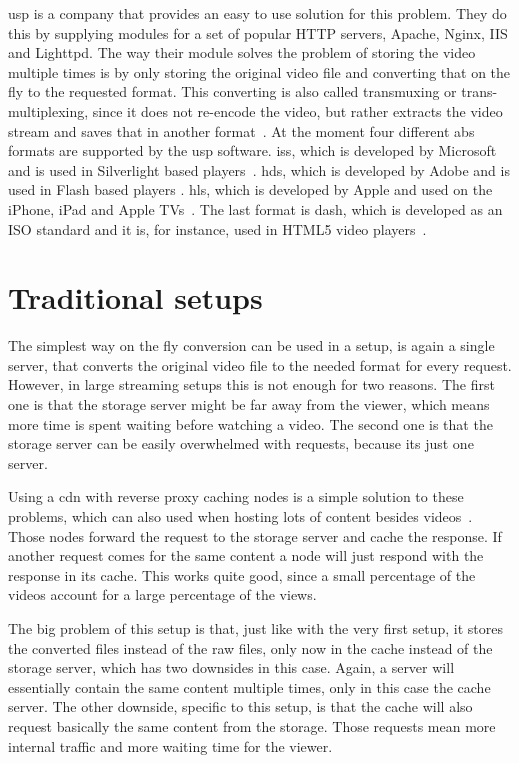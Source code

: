 \documentclass[twoside,openright]{uva-bachelor-thesis}
\begin{document}
\Gls{usp} is a company that provides an easy to use solution for this problem.
They do this by supplying modules for a set of popular HTTP servers, Apache,
Nginx, IIS and Lighttpd. The way their module solves the problem of storing the
video multiple times is by only storing the original video file and converting
that on the fly to the requested format. This converting is also called
transmuxing or trans-multiplexing, since it does not re-encode the video, but
rather extracts the video stream and saves that in another
format~\autocite{transmux}.  At the
moment four different \gls{abs} formats are supported by the \gls{usp} software.
\Gls{iss}, which is developed by Microsoft and is used in Silverlight based
players~\autocites{iss}{iss2}.  \Gls{hds}, which is developed by Adobe and is
used in Flash based players \autocite{hds}.  \Gls{hls}, which is developed by
Apple and used on the iPhone, iPad and Apple TVs~\autocite{hls}. The last format
is \gls{dash}, which is developed as an ISO standard and it is, for instance,
used in \textsc{HTML5} video players~\autocites{dash}{dash2}.


\section{Traditional setups}
The simplest way on the fly conversion can be used in a setup, is again a single
server, that converts the original video file to the needed format for every
request.  However, in large streaming setups this is not enough for two reasons.
The first one is that the storage server might be far away from the viewer,
which means more time is spent waiting before watching a video. The second one
is that the storage server can be easily overwhelmed with requests, because its
just one server.

Using a \gls{cdn} with reverse proxy caching nodes is a simple solution to these
problems, which can also used when hosting lots of content besides
videos~\autocites{cdns}{revproxy}. Those nodes forward the request to the
storage server and cache the response. If another request comes for the same
content a node will just respond with the response in its cache. This works
quite good, since a small percentage of the videos account for a large
percentage of the views.

The big problem of this setup is that, just like with the very first setup, it
stores the converted files instead of the raw files, only now in the cache
instead of the storage server, which has two downsides in this case. Again, a
server will essentially contain the same content multiple times, only in this
case the cache server. The other downside, specific to this setup, is that the
cache will also request basically the same content from the storage. Those
requests mean more internal traffic and more waiting time for the viewer.
\end{document}
